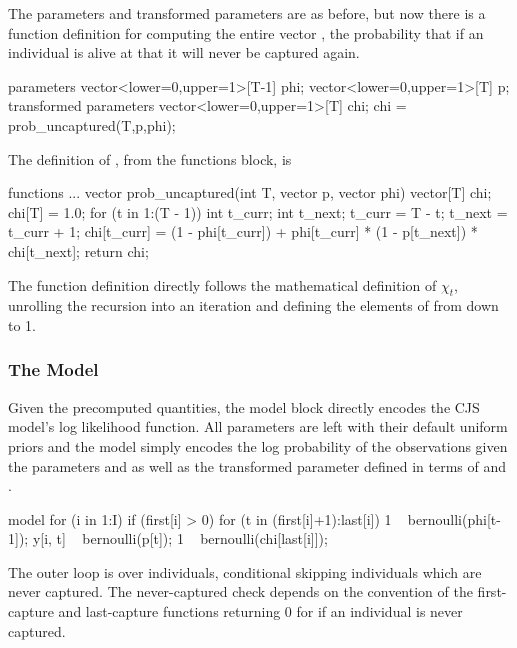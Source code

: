 The parameters and transformed parameters are as before, but now there
is a function definition for computing the entire vector , the
probability that if an individual is alive at  that it will
never be captured again.
%
\begin{stancode}
parameters {
  vector<lower=0,upper=1>[T-1] phi;
  vector<lower=0,upper=1>[T] p;
}
transformed parameters {
  vector<lower=0,upper=1>[T] chi;
  chi = prob_uncaptured(T,p,phi);
}
\end{stancode}
%
The definition of , from the functions block,
is
%
\begin{stancode}
functions {
  ...
  vector prob_uncaptured(int T, vector p, vector phi) {
    vector[T] chi;
    chi[T] = 1.0;
    for (t in 1:(T - 1)) {
      int t_curr;
      int t_next;
      t_curr = T - t;
      t_next = t_curr + 1;
      chi[t_curr] = (1 - phi[t_curr])
                     + phi[t_curr]
                       * (1 - p[t_next])
                       * chi[t_next];
    }
    return chi;
  }
}
\end{stancode}
%
The function definition directly follows the mathematical definition
of $\chi_t$, unrolling the recursion into an iteration and
defining the elements of  from  down to 1.

\subsubsection{The Model}

Given the precomputed quantities, the model block directly encodes the
CJS model's log likelihood function.  All parameters are left with
their default uniform priors and the model simply encodes the log
probability of the observations  given the parameters 
and  as well as the transformed parameter  defined
in terms of  and .
%
\begin{stancode}
model {
  for (i in 1:I) {
    if (first[i] > 0) {
      for (t in (first[i]+1):last[i]) {
        1 ~ bernoulli(phi[t-1]);
        y[i, t] ~ bernoulli(p[t]);
      }
      1 ~ bernoulli(chi[last[i]]);
    }
  }
}
\end{stancode}
%
The outer loop is over individuals, conditional skipping individuals
 which are never captured.  The never-captured check depends
on the convention of the first-capture and last-capture functions
returning 0 for  if an individual is never captured.

